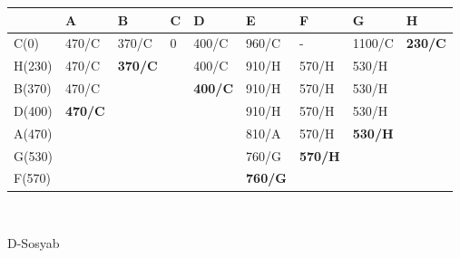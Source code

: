 \documentclass[12pt]{article}
\begin{document}
\begin{enumerate}
\begin{center}
\begin{tabular}{|l|llll|l|lll}
\hline
 & \multicolumn{1}{l|}{A} & \multicolumn{1}{l|}{B} & \multicolumn{1}{l|}{C} & D & E & \multicolumn{1}{l|}{F} & \multicolumn{1}{l|}{G} & \multicolumn{1}{l|}{H} \\ \hline
C(0) & \multicolumn{1}{l|}{470/C} & \multicolumn{1}{l|}{370/C} & \multicolumn{1}{l|}{0} & 400/C & 960/C & \multicolumn{1}{l|}{-} & \multicolumn{1}{l|}{1100/C} & \multicolumn{1}{l|}{\textbf{230/C}} \\ \hline
H(230) & \multicolumn{1}{l|}{470/C} & \multicolumn{1}{l|}{\textbf{370/C}} & \multicolumn{1}{l|}{} & 400/C & 910/H & \multicolumn{1}{l|}{570/H} & \multicolumn{1}{l|}{530/H} &  \\ \cline{1-3} \cline{5-8}
B(370) & \multicolumn{1}{l|}{470/C} &  & \multicolumn{1}{l|}{} & \textbf{400/C} & 910/H & \multicolumn{1}{l|}{570/H} & \multicolumn{1}{l|}{530/H} &  \\ \cline{1-2} \cline{5-8}
D(400) & \multicolumn{1}{l|}{\textbf{470/C}} &  &  &  & 910/H & \multicolumn{1}{l|}{570/H} & \multicolumn{1}{l|}{530/H} &  \\ \cline{1-2} \cline{6-8}
A(470) &  &  &  &  & 810/A & \multicolumn{1}{l|}{570/H} & \multicolumn{1}{l|}{\textbf{530/H}} &  \\ \cline{1-1} \cline{6-8}
G(530) &  &  &  &  & 760/G & \multicolumn{1}{l|}{\textbf{570/H}} &  &  \\ \cline{1-1} \cline{6-7}
F(570) & \textbf{} &  &  &  & \textbf{760/G} & \textbf{} &  &  \\ \cline{1-1} \cline{6-6}
\end{tabular}
\\
      \vspace{0.5cm}
      
            D-Sosyab


\end{center}
\end{enumerate}
\end{document}
